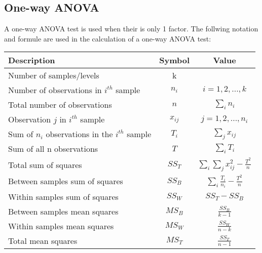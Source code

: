     \subsection{One-way ANOVA}
        A one-way ANOVA test is used when their is only 1 factor. The follwing notation and formule are used in the calculation of a one-way ANOVA test:
        \bgroup
        \def\arraystretch{2}
        \begin{center}
        \begin{tabular}{l|c|c}
        Description & Symbol & Value \\
        \hline
        Number of samples/levels & k & \\
        Number of observations in $i^{th}$ sample & $n_i$ & $i = 1, 2, ..., k$ \\
        Total number of observations & $n$ & $\displaystyle\sum_i{n_i}$ \\
        Observation $j$ in $i^{th}$ sample & $x_{ij}$ & $j = 1, 2, ..., n_i$ \\
        Sum of $n_i$ observations in the $i^{th}$ sample & $T_i$ & $\displaystyle\sum_j{x_{ij}}$ \\
        Sum of all n observations & $T$ & $\displaystyle\sum_i{T_i}$ \\
        \hline
        Total sum of squares & $SS_T$ & $\displaystyle\sum_i{\displaystyle\sum_j{x_{ij}^2}} - \frac{T^2}{n}$ \\
        Between samples sum of squares & $SS_B$ & $\displaystyle\sum_i{\frac{T_i}{n_i}} - \frac{T^2}{n}$ \\
        Within samples sum of squares & $SS_W$ & $SS_T - SS_B$ \\
        \hline
        Between samples mean squares & $MS_B$ & $\displaystyle\frac{SS_B}{k - 1}$ \\
        Within samples mean squares& $MS_W$ & $\displaystyle\frac{SS_W}{n - k}$ \\
        Total mean squares & $MS_T$ & $\displaystyle\frac{SS_T}{n - 1}$ \\
        \end{tabular}
        \end{center}
        \egroup

